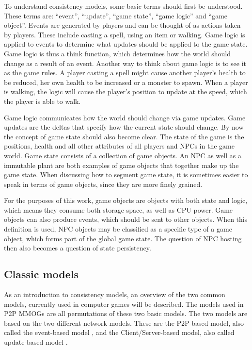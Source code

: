 \documentclass[journal,oneside,a4paper,onecolumn]{IEEEtran}
\begin{document}
To understand consistency models, some basic terms should first be understood. These terms are: ``event'', ``update'', ``game state'', ``game logic'' and ``game object''. Events are generated by players and can be thought of as actions taken by players. These include casting a spell, using an item or walking. Game logic is applied to events to determine what updates should be applied to the game state. Game logic is thus a think function, which determines how the world should change as a result of an event. Another way to think about game logic is to see it as the game rules. A player casting a spell might cause another player's health to be reduced, her own health to be increased or a monster to spawn. When a player is walking, the logic will cause the player's position to update at the speed, which the player is able to walk.

Game logic communicates how the world should change via game updates. Game updates are the deltas that specify how the current state should change. By now the concept of game state should also become clear. The state of the game is the positions, health and all other attributes of all players and NPCs in the game world. Game state consists of a collection of game objects. An NPC as well as a immutable plant are both examples of game objects that together make up the game state. When discussing how to segment game state, it is sometimes easier to speak in terms of game objects, since they are more finely grained.

For the purposes of this work, game objects are objects with both state and logic, which means they consume both storage space, as well as CPU power. Game objects can also produce events, which should be sent to other objects. When this definition is used, NPC objects may be classified as a specific type of a game object, which forms part of the global game state. The question of NPC hosting then also becomes a question of state persistency.

\subsection{Classic models}
\label{classic_models}

As an introduction to consistency models, an overview of the two common models, currently used in computer games will be described. The models used in P2P MMOGs are all permutations of these two basic models. The two models are based on the two different network models. These are the P2P-based model, also called the event-based model \cite{p2p_cm_aoe}, and the Client/Server-based model, also called update-based model \cite{unreal_networking}.
\end{document}
